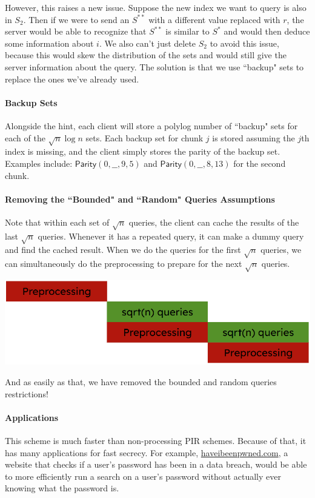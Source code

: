 However, this raises a new issue. Suppose the new index we want to query is also in $S_2$. Then if we were to send an $S^{**}$ with a different value replaced with $r$, the server would be able to recognize that $S^{**}$ is similar to $S^*$ and would then deduce some information about $i$. We also can't just delete $S_2$ to avoid this issue, because this would skew the distribution of the sets and would still give the server information about the query. The solution is that we use ``backup" sets to replace the ones we've already used.

\paragraph{Backup Sets}
Alongside the hint, each client will store a polylog number of ``backup" sets for each of the $\sqrt{n}\log n$ sets. Each backup set for chunk $j$ is stored assuming the $j$th index is missing, and the client simply stores the parity of the backup set. Examples include: $\mathsf{Parity}(0, \_\_, 9, 5)$ and $\mathsf{Parity}(0, \_\_, 8, 13)$ for the second chunk. 

\paragraph{Removing the ``Bounded" and ``Random" Queries Assumptions}
Note that within each set of $\sqrt{n}$ queries, the client can cache the results of the last $\sqrt{n}$ queries. Whenever it has a repeated query, it can make a dummy query and find the cached result. When we do the queries for the first $\sqrt{n}$ queries, we can simultaneously do the preprocessing to prepare for the next $\sqrt{n}$ queries.

\begin{center}
    \includegraphics[scale=0.77]{scrbimg.png}
\end{center}

And as easily as that, we have removed the bounded and random queries restrictions!

\paragraph{Applications}
This scheme is much faster than non-processing PIR schemes. Because of that, it has many applications for fast secrecy. For example, \href{https://haveibeenpwned.com/}{haveibeenpwned.com}, a website that checks if a user's password has been in a data breach, would be able to more efficiently run a search on a user's password without actually ever knowing what the password is.
